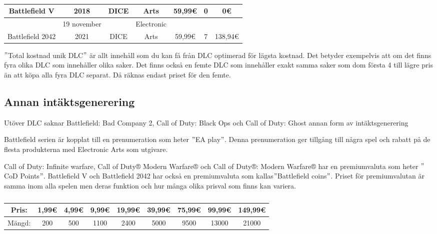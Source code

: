 \documentclass[11p]{article}
\begin{document}
\begin{otherlanguage}{swedish}
\begin{table}[htbp]
\begin{tabular}{|c|c|c|c|c|c|c|}
            Battlefield V & 2018 & DICE & Arts & 59,99€ & 0 & 0€\\
            \hline
            & 19 november && Electronic &&&\\ [-2pt]
            Battlefield 2042 & 2021 & DICE &  Arts & 59,99€ & 7 & 138,94€\\
            \hline
        \end{tabular}
        \caption{}
        \label{tab:Resultat}
    \end{table}
    \("\)Total kostnad unik DLC\("\) är allt innehåll som du kan få från DLC optimerad för lägsta kostnad.
    Det betyder exempelvis att om det finns fyra olika DLC som innehåller olika saker.
    Det finns också en femte DLC som innehåller exakt samma saker som dom första 4 till lägre pris än att köpa alla fyra DLC separat.
    Då räknas endast priset för den femte.

    \subsection{Annan intäktsgenerering}
    Utöver DLC saknar Battlefield: Bad Company 2, Call of Duty: Black Ops och Call of Duty: Ghost annan form av intäktsgenerering

    Battlefield serien är kopplat till en prenumeration som heter \("\)EA play\("\).
    Denna prenumeration ger tillgång till några spel och rabatt på de flesta produkterna med Electronic Arts som utgivare.

    Call of Duty: Infinite warfare, Call of Duty® Modern Warfare® och Call of Duty®: Modern Warfare® har en premiumvaluta som heter \("\)CoD Points\("\).
    Battlefield V och Battlefield 2042 har också en premiumvaluta som kallas\("\)Battlefield coins\("\).
    Priset för premiumvalutan är samma inom alla spelen men deras funktion och hur många olika prisval som finns kan variera.
    \begin{table}[htbp]
        \begin{tabular}{|c|c|c|c|c|c|c|c|c|}
            \hline
            Pris:  & 1,99€ & 4,99€ & 9,99€ & 19,99€ & 39,99€ & 75,99€ & 99,99€ & 149,99€ \\
            \hline
            Mängd: & 200 & 500 & 1100 & 2400 & 5000 & 9500 & 13000 & 21000\\
            \hline
        \end{tabular}
        \caption{}
        \label{tab:Premium}
    \end{table}

\end{otherlanguage}
\end{document}
